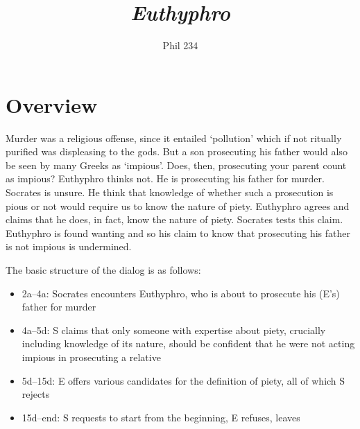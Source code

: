 \documentclass[11pt]{article}
\begin{document}
\author{Phil 234}
\title{\emph{Euthyphro}}
\maketitle
\thispagestyle{empty}

\section*{Overview}

Murder was a religious offense, since it entailed `pollution' which if not ritually purified was displeasing to the gods. But a son prosecuting his father would also be seen by many Greeks as `impious'. Does, then, prosecuting your parent count as impious? Euthyphro thinks not. He is prosecuting his father for murder.  Socrates is unsure. He think that knowledge of whether such a prosecution is pious or not would require us to know the nature of piety. Euthyphro agrees and claims that he does, in fact, know the nature of piety. Socrates tests this claim. Euthyphro  is found wanting and so his claim to know that prosecuting his father is not impious is undermined. 

The basic structure of the dialog is as follows: 
\begin{itemize}\item{2a--4a: Socrates encounters Euthyphro, who is about to prosecute his (E's) father for murder}\item{4a--5d: S claims that only someone with expertise about piety, crucially including knowledge of its nature, should be confident that he were not acting impious in prosecuting a relative}\item{5d--15d: E offers various candidates for the definition of piety, all of which S rejects}\item{15d--end: S requests to start from the beginning, E refuses, leaves}\end{itemize}



\end{document}
